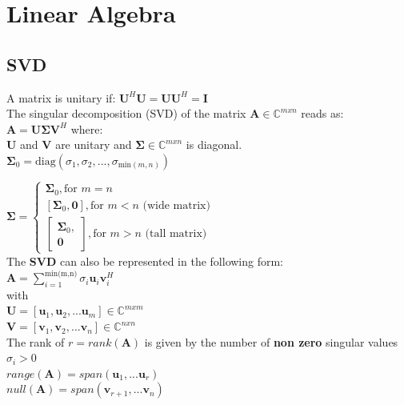 \documentclass[english]{latex4ei/latex4ei_sheet}
\begin{document}
\section{Linear Algebra}
\begin{sectionbox}
    \subsection{SVD}
    A matrix is unitary if: $\mathbf{U}^H\mathbf{U}=\mathbf{U}\mathbf{U}^H =\mathbf{I}$\\

    The singular decomposition (SVD) of the matrix $\mathbf{A}\in\mathbb{C}^{mxn}$ reads as:\\
    $\mathbf{A} = \mathbf{U}\mathbf{\Sigma}\mathbf{V}^H$ where:\\
    $\mathbf{U}$ and $\mathbf{V}$ are unitary and $\mathbf{\Sigma}\in\mathbb{C}^{mxn}$ is diagonal.\\

    $\mathbf{\Sigma}_0 = \text{diag}(\sigma_1, \sigma_2, ...,\sigma_{\text{min}(m,n)})$

    $\mathbf{\Sigma} = \begin{cases}
            \mathbf{\Sigma}_0, \text{for } m=n                                       \\
            [\mathbf{\Sigma}_0, \mathbf{0}], \text{for } m < n \text{ (wide matrix)} \\
            \begin{bmatrix}
                \mathbf{\Sigma}_0, \\
                \mathbf{0}
            \end{bmatrix}, \text{for } m > n \text{ (tall matrix)}
        \end{cases}$\\

    The \textbf{SVD} can also be represented in the following form:\\

    $\mathbf{A} = \sum_{i=1}^{\text{min(m,n)}} \sigma_i \mathbf{u}_i\mathbf{v}_i^H$\\

    with\\
    $\mathbf{U} = [\mathbf{u}_1,\mathbf{u}_2,...\mathbf{u}_m] \in\mathbb{C}^{mxm}$\\
    $\mathbf{V} = [\mathbf{v}_1, \mathbf{v}_2, ...\mathbf{v}_n] \in\mathbb{C}^{nxn}$\\

    The rank of $r=rank(\mathbf{A})$ is given by the number of \textbf{non zero} singular values $\sigma_i>0$\\
    $range(\mathbf{A}) = span(\mathbf{u}_1,...\mathbf{u}_r)$\\
    $null(\mathbf{A}) = span(\mathbf{v}_{r+1},  ...\mathbf{v}_n)$\\


\end{sectionbox}
\end{document}
